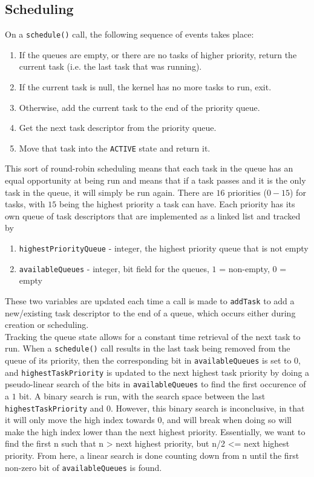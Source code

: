 \documentclass[12pt]{article}
\begin{document}
\subsection{Scheduling}
On a \texttt{schedule()} call, the following sequence of events takes place:
\begin{enumerate}
  \item If the queues are empty, or there are no tasks of higher priority, return the current task (i.e. the last task that was running).
  \item If the current task is null, the kernel has no more tasks to run, exit.
  \item Otherwise, add the current task to the end of the priority queue.
  \item Get the next task descriptor from the priority queue.
  \item Move that task into the \texttt{ACTIVE} state and return it.
\end{enumerate}
This sort of round-robin scheduling means that each task in the queue has an equal opportunity at being run and means that if a task passes and it is the only task in the queue, it will simply be run again.  There are $16$ priorities ($0 - 15$) for tasks, with $15$ being the highest priority a task can have.  Each priority has its own queue of task descriptors that are implemented as a linked list and tracked by
\begin{enumerate}
  \item \texttt{highestPriorityQueue} - integer, the highest priority queue that is not empty
  \item \texttt{availableQueues} - integer, bit field for the queues, $1$ = non-empty, $0$ = empty
\end{enumerate}
These two variables are updated each time a call is made to \texttt{addTask} to add a new/existing task descriptor to the end of a queue, which occurs either during creation or scheduling.\\

Tracking the queue state allows for a constant time retrieval of the next task to run.  When a \texttt{schedule()} call results in the last task being removed from the queue of its priority, then the corresponding bit in \texttt{availableQueues} is set to $0$, and \texttt{highestTaskPriority} is updated to the next highest task priority by doing a pseudo-linear search of the bits in \texttt{availableQueues} to find the first occurence of a $1$ bit.  A binary search is run, with the search space between the last \texttt{highestTaskPriority} and $0$.  However, this binary search is inconclusive, in that it will only move the high index towards 0, and will break when doing so will make the high index lower than the next highest priority. Essentially, we want to find the first n such that n > next highest priority, but n/2 <= next highest priority. From here, a linear search is done counting down from n until the first non-zero bit of \texttt{availableQueues} is found. \\
\end{document}
